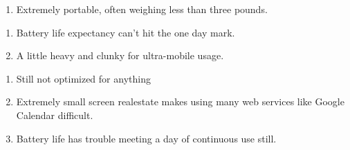 \documentclass[letterpaper]{article}
\begin{document}
{\begin{enumerate}
\item Extremely portable, often weighing less than three pounds.

\end{enumerate}

\newpage


\begin{enumerate}

\item Battery life expectancy can't hit the one day mark.

\item A little heavy and clunky for ultra-mobile usage.

\end{enumerate}

\newpage


\begin{enumerate}

\item Still not optimized for anything

\item Extremely small screen realestate makes using many web services like
  Google Calendar difficult.

\item Battery life has trouble meeting a day of continuous use still.

\end{enumerate}

}
\end{document}
